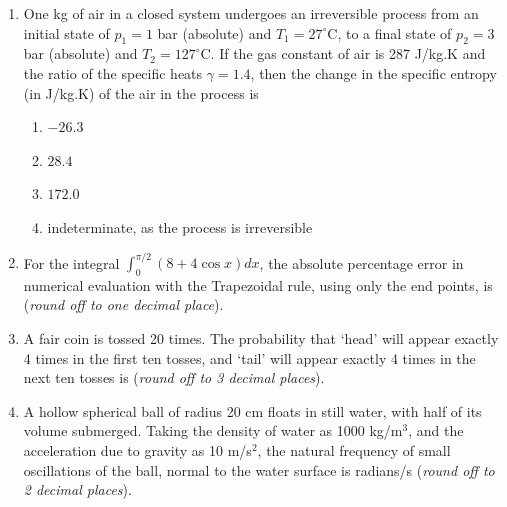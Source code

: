\documentclass[12pt,onecolumn]{article}
\begin{document}
\begin{enumerate}
    \item One kg of air in a closed system undergoes an irreversible process from an initial state of $p_1 = 1$ bar (absolute) and $T_1 = 27^\circ$C, to a final state of $p_2 = 3$ bar (absolute) and $T_2 = 127^\circ$C. If the gas constant of air is 287 J/kg.K and the ratio of the specific heats $\gamma = 1.4$, then the change in the specific entropy (in J/kg.K) of the air in the process is
          \begin{enumerate}
              \item $-26.3$
              \item $28.4$
              \item $172.0$
              \item indeterminate, as the process is irreversible
          \end{enumerate}

    \item For the integral $\int_0^{\pi/2} (8 + 4\cos x) dx$, the absolute percentage error in numerical evaluation with the Trapezoidal rule, using only the end points, is \underline{\hspace{2cm}} (\textit{round off to one decimal place}).

    \item A fair coin is tossed 20 times. The probability that `head' will appear exactly 4 times in the first ten tosses, and `tail' will appear exactly 4 times in the next ten tosses is \underline{\hspace{2cm}} (\textit{round off to 3 decimal places}).

    \item A hollow spherical ball of radius 20 cm floats in still water, with half of its volume submerged. Taking the density of water as 1000 kg/m$^3$, and the acceleration due to gravity as 10 m/s$^2$, the natural frequency of small oscillations of the ball, normal to the water surface is \underline{\hspace{2cm}} radians/s (\textit{round off to 2 decimal places}).


\end{enumerate}
\end{document}
